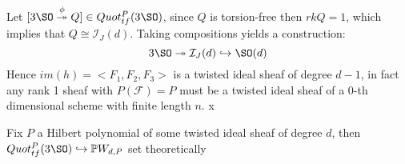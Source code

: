 Let $[3 \SO \overset{\phi}{\twoheadrightarrow} Q] \in Quot_{tf}^P(3\SO)$, since $Q$ is torsion-free then $rk Q = 1$, which implies that $Q \cong \mathcal{I}_J (d)$. Taking compositions yields a construction:  
\begin{equation}
    3\SO \twoheadrightarrow \mathcal{I}_J(d) \hookrightarrow \SO(d)
\end{equation}
Hence $im(h) = <F_1,F_2,F_3>$ is a twisted ideal sheaf of degree $d-1$, in fact any rank 1 sheaf with $P(\mathcal{F}) = P$ must be a twisted ideal sheaf of a $0$-th dimensional scheme with finite length $n$.
x

\begin{proposition}\label{from_quot}
Fix $P$ a Hilbert polynomial of some twisted ideal sheaf of degree $d$, then $Quot^P_{tf}(3 \SO) \hookrightarrow \mathbb{P}W_{d,P}$ set theoretically
\end{proposition}
